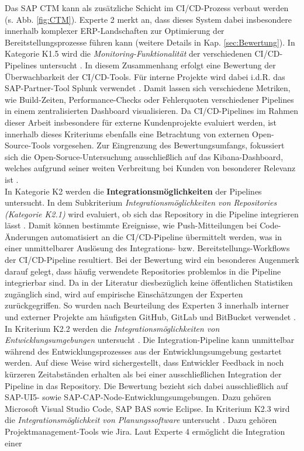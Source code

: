 Das SAP CTM kann als zusätzliche Schicht im CI/CD-Prozess verbaut werden (s. Abb. \ref{fig:CTM}). Experte 2 merkt an, dass dieses System dabei insbesondere innerhalb komplexer ERP-Landschaften zur Optimierung der Bereitstellungsprozesse führen kann (weitere Details in Kap. \ref{sec:Bewertung})\cite[Z. 65 ff.]{ProductManagerSAPHyperspaceCICD.}. In Kategorie K1.5 wird die \textit{Monitoring-Funktionalität} der verschiedenen CI/CD-Pipelines untersucht \cite[Z. 37 ff.]{ProductManagerSAPHyperspaceCICD.}. In diesem Zusammenhang erfolgt eine Bewertung der Überwachbarkeit der CI/CD-Tools. Für interne Projekte wird dabei i.d.R. das SAP-Partner-Tool Splunk verwendet \cite[Z. 74 ff.]{ProductManagerSAPHyperspaceCICD.}. Damit lassen sich verschiedene Metriken, wie Build-Zeiten, Performance-Checks oder Fehlerquoten verschiedener Pipelines in einem zentralisierten Dashboard visualisieren. Da CI/CD-Pipelines im Rahmen dieser Arbeit insbesondere für externe Kundenprojekte evaluiert werden, ist innerhalb dieses Kriteriums ebenfalls eine Betrachtung von externen Open-Source-Tools vorgesehen. Zur Eingrenzung des Bewertungsumfangs, fokussiert sich die Open-Soruce-Untersuchung ausschließlich auf das Kibana-Dashboard, welches aufgrund seiner weiten Verbreitung bei Kunden von besonderer Relevanz ist \cite[Z. 74 ff.]{ProductManagerSAPHyperspaceCICD.}.\\In Kategorie K2 werden die \textbf{Integrationsmöglichkeiten} der Pipelines untersucht. In dem Subkriterium \textit{Integrationsmöglichkeiten von Repositories (Kategorie K2.1)} wird evaluiert, ob sich das Repository in die Pipeline integrieren lässt \cite[Z. 89 ff.]{ProductOwnerSAPBTPProd&Infra.}. Damit können bestimmte Ereignisse, wie Push-Mitteilungen bei Code-Änderungen automatisiert an die CI/CD-Pipeline übermittelt werden, was in einer unmittelbarer Auslösung des Integrations- bzw. Bereitstellungs-Workflows der CI/CD-Pipeline resultiert. Bei der Bewertung wird ein besonderes Augenmerk darauf gelegt, dass häufig verwendete Repositories problemlos in die Pipeline integrierbar sind. Da in der Literatur diesbezüglich keine öffentlichen Statistiken zugänglich sind, wird auf empirische Einschätzungen der Experten zurückgegriffen. So wurden nach Beurteilung des Experten 3 innerhalb interner und externer Projekte am häufigsten GitHub, GitLab und BitBucket verwendet \cite[Z. 95 ff.]{TestDeveloperSAPHyperspaceAdoption&Onboarding.}. In Kriterium K2.2 werden die \textit{Integrationsmöglichkeiten von Entwicklungsumgebungen} untersucht \cite[Z. 93 ff.]{ProductOwnerSAPBTPProd&Infra.}. Die Integration-Pipeline kann unmittelbar während des Entwicklungsprozesses aus der Entwicklungsumgebung gestartet werden. Auf diese Weise wird sichergestellt, dass Entwickler Feedback in noch kürzeren Zeitabständen erhalten als bei einer ausschließlichen Integration der Pipeline in das Repository. Die Bewertung bezieht sich dabei ausschließlich auf SAP-UI5- sowie SAP-CAP-Node-Entwicklungsumgebungen. Dazu gehören Microsoft Visual Studio Code, \ac{SAP BAS} sowie Eclipse. In Kriterium K2.3 wird die \textit{Integrationsmöglichkeit von Planungssoftware} untersucht \cite[Z. 96 ff.]{TestDeveloperSAPHyperspaceAdoption&Onboarding.}. Dazu gehören Projektmanagement-Tools wie Jira. Laut Experte 4 ermöglicht die Integration einer 